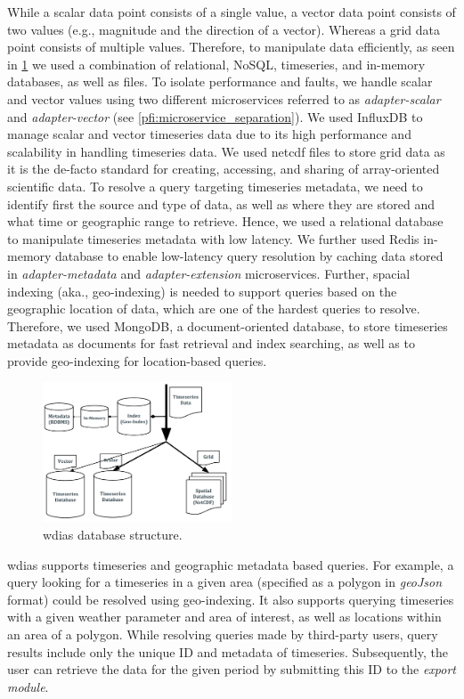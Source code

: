 \documentclass[conference]{IEEEtran}
\begin{document}
While a scalar data point consists of a single value, a vector data point consists of two values (e.g., magnitude and the direction of a vector). Whereas a grid data point consists of multiple values. Therefore, to manipulate data efficiently, as seen in \cref{pfi:database_structure} we used a combination of relational, NoSQL, timeseries, and in-memory databases, as well as files.
To isolate performance and faults, we handle scalar and vector values using two different microservices referred to as \textit{adapter-scalar} and \textit{adapter-vector} (see \cref{pfi:microservice_separation}). We used InfluxDB to manage scalar and vector timeseries data due to its high performance and scalability in handling timeseries data. We used \acrshort{netcdf} files to store grid data as it is the de-facto standard for creating, accessing, and sharing of array-oriented scientific data. To resolve a query targeting timeseries metadata, we need to identify first the source and type of data, as well as where they are stored and what time or geographic range to retrieve. Hence, we used a relational database to manipulate timeseries metadata with low latency. We further used Redis in-memory database to enable low-latency query resolution by caching data stored in \textit{adapter-metadata} and \textit{adapter-extension} microservices. Further, spacial indexing (aka., geo-indexing) is needed to support queries based on the geographic location of data, which are one of the hardest queries to resolve. Therefore, we used MongoDB, a document-oriented database, to store timeseries metadata as documents for fast retrieval and index searching, as well as to provide geo-indexing for location-based queries.

\begin{figure}[!tb]
\centerline{\includegraphics[width=0.5\textwidth]{images/wdias_database_structure_p1.pdf}}
\caption{\acrshort{wdias} database structure.}
\label{pfi:database_structure}
\end{figure}

\acrshort{wdias} supports timeseries and geographic metadata based queries. For example, a query looking for a timeseries in a given area (specified as a polygon in \emph{geoJson} \cite{InternetEngineeringTaskForceGeoJSON} format) could be resolved using geo-indexing. It also supports querying timeseries with a given weather parameter and area of interest, as well as locations within an area of a polygon. While resolving queries made by third-party users, query results include only the unique ID and metadata of timeseries. Subsequently, the user can retrieve the data for the given period by submitting this ID to the \emph{export module}.
\end{document}
